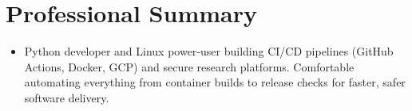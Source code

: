 \section{Professional Summary}
\vspace{2pt}
\begin{itemize}[leftmargin=0.0in, label={}]
    \item{
        \normalsize{
            Python developer and Linux power‑user building CI/CD pipelines (GitHub Actions, Docker, GCP) and secure research platforms. Comfortable automating everything from container builds to release checks for faster, safer software delivery.
        }
    }
\end{itemize}